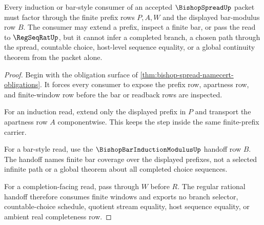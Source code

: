 \begin{theorem}
\label{thm:bishop-spread-finite-prefix-induction}
Every induction or bar-style consumer of an accepted $\BishopSpreadUp$ packet must factor through the finite prefix rows $P,A,W$ and the displayed bar-modulus row $B$. The consumer may extend a prefix, inspect a finite bar, or pass the read to $\RegSeqRatUp$, but it cannot infer a completed branch, a chosen path through the spread, countable choice, host-level sequence equality, or a global continuity theorem from the packet alone.
\end{theorem}
\begin{proof}
Begin with the obligation surface of \autoref{thm:bishop-spread-namecert-obligations}. It forces every consumer to expose the prefix row, apartness row, and finite-window row before the bar or readback rows are inspected.

For an induction read, extend only the displayed prefix in $P$ and transport the apartness row $A$ componentwise. This keeps the step inside the same finite-prefix carrier.

For a bar-style read, use the $\BishopBarInductionModulusUp$ handoff row $B$. The handoff names finite bar coverage over the displayed prefixes, not a selected infinite path or a global theorem about all completed choice sequences.

For a completion-facing read, pass through $W$ before $R$. The regular rational handoff therefore consumes finite windows and exports no branch selector, countable-choice schedule, quotient stream equality, host sequence equality, or ambient real completeness row.
\end{proof}




